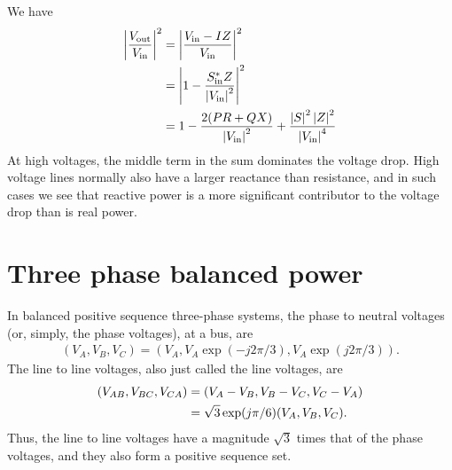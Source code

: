 \documentclass[11pt]{article}
\begin{document}
We have
\begin{align}
	\left|\frac{V_\text{out}}{V_\text{in}}\right|^2 &= \left|\frac{V_\text{in} - IZ}{V_\text{in}}\right|^2 \notag \\
	&= \left|1 - \frac{S^*_\text{in}Z}{\left|V_\text{in}\right|^2}\right|^2 \notag \\
	&= 1 - \frac{2(PR + QX)}{\left|V_\text{in}\right|^2} + \frac{\left|S\right|^2\left|Z\right|^2}{\left|V_\text{in}\right|^4}
\end{align}
At high voltages, the middle term in the sum dominates the voltage drop. High voltage lines normally also have a larger reactance than resistance, and in such cases we see that reactive power is a more significant contributor to the voltage drop than is real power.
\section{Three phase balanced power}
In balanced positive sequence three-phase systems, the phase to neutral voltages (or, simply, the phase voltages), at a bus, are 
\begin{align}
(V_A, V_B, V_C) = (V_A, V_A\exp(-j2\pi/3), V_A\exp(j2\pi/3)).
\end{align}
The line to line voltages, also just called the line voltages, are 
\begin{align}
(V_{AB}, V_{BC}, V_{CA}) &= (V_A - V_B, V_B - V_C, V_C - V_A) \notag \\
&= \sqrt{3}\exp(j\pi/6)(V_A, V_B, V_C).
\end{align}
Thus, the line to line voltages have a magnitude $\sqrt{3}$ times that of the phase voltages, and they also form a positive sequence set.
\end{document}
